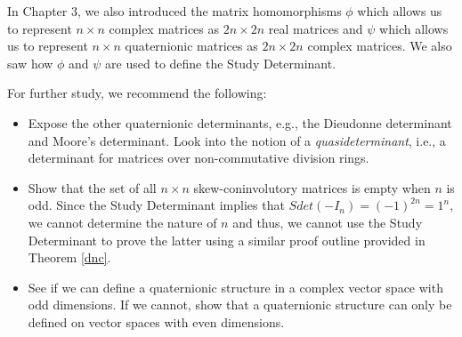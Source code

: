 In Chapter 3, we also introduced the matrix homomorphisms $\phi$ which allows us to represent $n \times n$ complex matrices as $2n\times 2n$ real matrices and $\psi$ which allows us to represent $n \times n$ quaternionic matrices as $2n\times 2n$ complex matrices. We also saw how $\phi$ and $\psi$ are used to define the Study Determinant. 

For further study, we recommend the following:

\begin{itemize}
	\item Expose the other quaternionic determinants, e.g., the Dieudonne determinant and Moore's determinant. Look into the notion of a \emph{quasideterminant}, i.e., a determinant for matrices over non-commutative division rings.
	\item Show that the set of all $n\times n$ skew-coninvolutory matrices is empty when $n$ is odd. Since the Study Determinant implies that $Sdet(-I_n) = (-1)^{2n} = 1^n$, we cannot determine the nature of $n$ and thus, we cannot use the Study Determinant to prove the latter using a similar proof outline provided in Theorem \ref{dnc}.
	\item See if we can define a quaternionic structure in a complex vector space with odd dimensions. If we cannot, show that a quaternionic structure can only be defined on vector spaces with even dimensions.
\end{itemize}
